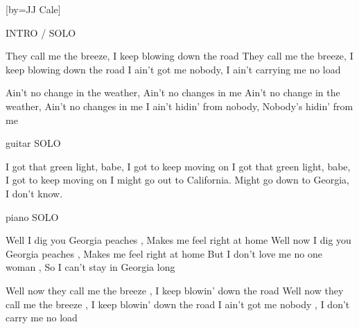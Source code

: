 

[by=JJ Cale]


\beginchorus
INTRO / SOLO
\endchorus

\beginverse
They call me the breeze, \brk  I keep blowing down the road
They call me the breeze, \brk  I keep blowing down the road
I ain't got me nobody, \brk  I ain't carrying me no load
\endverse

\beginverse
Ain't no change in the weather, \brk  Ain't no changes in me
Ain't no change in the weather, \brk  Ain't no changes in me
I ain't hidin' from nobody, \brk  Nobody's hidin' from me
\endverse

\beginchorus
guitar SOLO
\endchorus

\beginverse
I got that green light, babe, \brk  I got to keep moving on
I got that green light, babe, \brk  I got to keep moving on
I might go out to California.
Might go down to Georgia, I don't know.
\endverse

\beginchorus
piano SOLO
\endchorus


\beginverse
Well I dig you Georgia peaches , \brk  Makes me feel right at home 
Well now I dig you Georgia peaches , \brk  Makes me feel right at home 
But I don't love me no one woman , \brk  So I can't stay in Georgia long
\endverse

\beginverse
Well now they call me the breeze , \brk  I keep blowin' down the road 
Well now they call me the breeze , \brk  I keep blowin' down the road 
I ain't got me nobody , \brk  I don't carry me no load 
\endverse

\endsong
